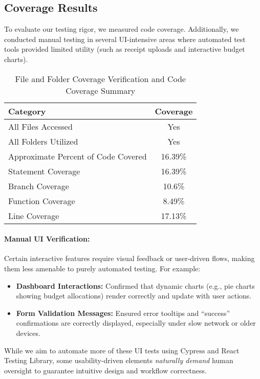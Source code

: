 \documentclass[12pt, titlepage]{article}
\begin{document}
\subsection{Coverage Results}

To evaluate our testing rigor, we measured code coverage. Additionally, we conducted  
manual testing in several UI-intensive areas where automated test tools provided  
limited utility (such as receipt uploads and interactive budget charts).

\noindent
\begin{table}[h]
  \centering
  \begin{tabular}{|l|c|}
      \hline
      \textbf{Category} & \textbf{Coverage} \\
      \hline
      All Files Accessed & Yes \\
      All Folders Utilized & Yes \\
      Approximate Percent of Code Covered & 16.39\% \\
      Statement Coverage & 16.39\% \\
      Branch Coverage & 10.6\% \\
      Function Coverage & 8.49\% \\
      Line Coverage & 17.13\% \\
      \hline
  \end{tabular}
  \caption{File and Folder Coverage Verification and Code Coverage Summary}
  \label{tab:file_coverage}
\end{table}

  
\paragraph{Manual UI Verification:}
Certain interactive features require visual feedback or user-driven flows, making them less  
amenable to purely automated testing. For example:
\begin{itemize}
  \item \textbf{Dashboard Interactions:} Confirmed that dynamic charts (e.g., pie charts  
    showing budget allocations) render correctly and update with user actions.
  \item \textbf{Form Validation Messages:} Ensured error tooltips and “success”  
    confirmations are correctly displayed, especially under slow network or older devices.
\end{itemize}
While we aim to automate more of these UI tests using Cypress and React Testing Library,  
some usability-driven elements \emph{naturally demand} human oversight to guarantee 
intuitive design and workflow correctness.
\end{document}
